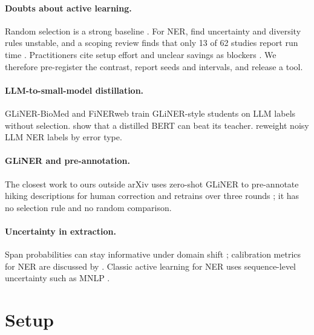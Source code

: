 \documentclass[11pt]{article}
\begin{document}
\paragraph{Doubts about active learning.} Random selection is a strong baseline \citep{fragility2024,partingillusions2019}. For NER, \citet{chemal2026} find uncertainty and diversity rules unstable, and a scoping review finds that only 13 of 62 studies report run time \citep{alnerreview2024}. Practitioners cite setup effort and unclear savings as blockers \citep{reassessal2026}. We therefore pre-register the contrast, report seeds and intervals, and release a tool.

\paragraph{LLM-to-small-model distillation.} GLiNER-BioMed \citep{glinerbiomed2025} and FiNERweb \citep{finerweb2025} train GLiNER-style students on LLM labels without selection. \citet{clinicalie2025} show that a distilled BERT can beat its teacher. \citet{noisyner2026} reweight noisy LLM NER labels by error type.

\paragraph{GLiNER and pre-annotation.} The closest work to ours outside arXiv uses zero-shot GLiNER to pre-annotate hiking descriptions for human correction and retrains over three rounds \citep{tafer2026hiking}; it has no selection rule and no random comparison.

\paragraph{Uncertainty in extraction.} Span probabilities can stay informative under domain shift \citep{finner2026}; calibration metrics for NER are discussed by \citet{nercalib2024}. Classic active learning for NER uses sequence-level uncertainty such as MNLP \citep{mnlp2017}.

\section{Setup}
\label{sec:setup}
\end{document}
